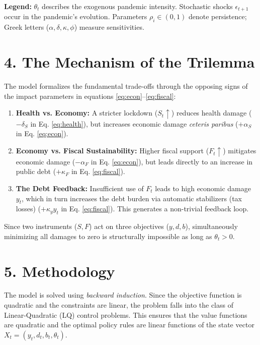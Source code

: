 \noindent \textbf{Legend:} $\theta_t$ describes the exogenous pandemic intensity. Stochastic shocks $\epsilon_{t+1}$ occur in the pandemic's evolution. Parameters $\rho_i \in (0,1)$ denote persistence; Greek letters ($\alpha, \delta, \kappa, \phi$) measure sensitivities.

\section*{4. The Mechanism of the Trilemma}
The model formalizes the fundamental trade-offs through the opposing signs of the impact parameters in equations \eqref{eq:econ}--\eqref{eq:fiscal}:

\begin{enumerate}
    \item \textbf{Health vs. Economy:} A stricter lockdown ($S_t \uparrow$) reduces health damage ($-\delta_S$ in Eq. \ref{eq:health}), but increases economic damage \textit{ceteris paribus} ($+\alpha_S$ in Eq. \ref{eq:econ}).
    \item \textbf{Economy vs. Fiscal Sustainability:} Higher fiscal support ($F_t \uparrow$) mitigates economic damage ($-\alpha_F$ in Eq. \ref{eq:econ}), but leads directly to an increase in public debt ($+\kappa_F$ in Eq. \ref{eq:fiscal}).
    \item \textbf{The Debt Feedback:} Insufficient use of $F_t$ leads to high economic damage $y_t$, which in turn increases the debt burden via automatic stabilizers (tax losses) ($+\kappa_y y_t$ in Eq. \ref{eq:fiscal}). This generates a non-trivial feedback loop.
\end{enumerate}

\noindent Since two instruments ($S, F$) act on three objectives ($y, d, b$), simultaneously minimizing all damages to zero is structurally impossible as long as $\theta_t > 0$.



\section*{5. Methodology}
The model is solved using \textit{backward induction}. Since the objective function is quadratic and the constraints are linear, the problem falls into the class of Linear-Quadratic (LQ) control problems. This ensures that the value functions are quadratic and the optimal policy rules are linear functions of the state vector $X_t = (y_t, d_t, b_t, \theta_t)$.

